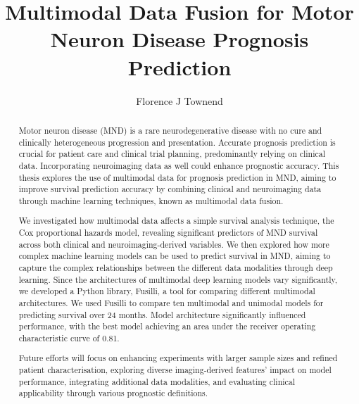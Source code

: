 
\title{Multimodal Data Fusion for Motor Neuron Disease Prognosis Prediction}
\author{Florence J Townend}

\maketitle
\makedeclaration

\begin{abstract} %

    Motor neuron disease (MND) is a rare neurodegenerative disease with no cure and clinically heterogeneous progression and presentation.
    Accurate prognosis prediction is crucial for patient care and clinical trial planning, predominantly relying on clinical data. 
    Incorporating neuroimaging data as well could enhance prognostic accuracy.
    This thesis explores the use of multimodal data for prognosis prediction in MND, aiming to improve survival prediction accuracy by combining clinical and neuroimaging data through machine learning techniques, known as multimodal data fusion.

    We investigated how multimodal data affects a simple survival analysis technique, the Cox proportional hazards model, revealing significant predictors of MND survival across both clinical and neuroimaging-derived variables.
    We then explored how more complex machine learning models can be used to predict survival in MND, aiming to capture the complex relationships between the different data modalities through deep learning.
    Since the architectures of multimodal deep learning models vary significantly, we developed a Python library, Fusilli, a tool for comparing different multimodal architectures.
    We used Fusilli to compare ten multimodal and unimodal models for predicting survival over 24 months.
    Model architecture significantly influenced performance, with the best model achieving an area under the receiver operating characteristic curve of 0.81.

    Future efforts will focus on enhancing experiments with larger sample sizes and refined patient characterisation, exploring diverse imaging-derived features' impact on model performance, integrating additional data modalities, and evaluating clinical applicability through various prognostic definitions.

\end{abstract}




\setcounter{tocdepth}{2} 

\tableofcontents
\listoffigures
\listoftables

